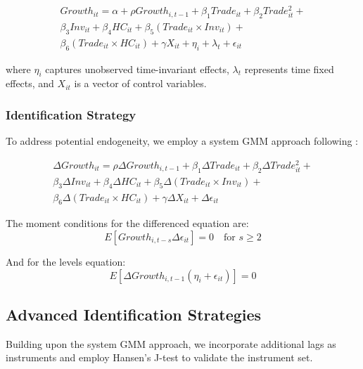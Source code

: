 \documentclass[12pt,a4paper]{article}
\theoremstyle{definition}
\begin{document}
\begin{equation}
\begin{split}
Growth_{it} = \alpha + \rho Growth_{i,t-1} + \beta_1 Trade_{it} + \beta_2 Trade_{it}^2 + \\
\beta_3 Inv_{it} + \beta_4 HC_{it} + \beta_5 (Trade_{it} \times Inv_{it}) + \\
\beta_6 (Trade_{it} \times HC_{it}) + \gamma X_{it} + \eta_i + \lambda_t + \epsilon_{it}
\end{split}
\end{equation}

where $\eta_i$ captures unobserved time-invariant effects, $\lambda_t$ represents time fixed effects, and $X_{it}$ is a vector of control variables.

\subsubsection{Identification Strategy}
To address potential endogeneity, we employ a system GMM approach following \cite{blundell1998initial}:

\begin{equation}
\begin{split}
\Delta Growth_{it} = \rho \Delta Growth_{i,t-1} + \beta_1 \Delta Trade_{it} + \beta_2 \Delta Trade_{it}^2 + \\
\beta_3 \Delta Inv_{it} + \beta_4 \Delta HC_{it} + \beta_5 \Delta(Trade_{it} \times Inv_{it}) + \\
\beta_6 \Delta(Trade_{it} \times HC_{it}) + \gamma \Delta X_{it} + \Delta \epsilon_{it}
\end{split}
\end{equation}

The moment conditions for the differenced equation are:
\begin{equation}
E[Growth_{i,t-s} \Delta \epsilon_{it}] = 0 \quad \text{for } s \geq 2
\end{equation}

And for the levels equation:
\begin{equation}
E[\Delta Growth_{i,t-1}(\eta_i + \epsilon_{it})] = 0
\end{equation}

\subsection{Advanced Identification Strategies}
Building upon the system GMM approach, we incorporate additional lags as instruments and employ Hansen's J-test to validate the instrument set.
\end{document}
